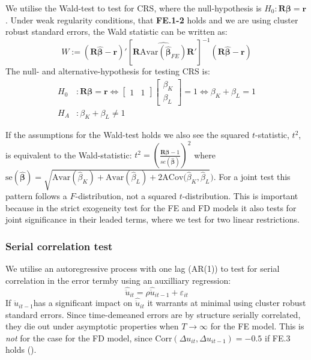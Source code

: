 
We utilise the Wald-test to test for CRS, where the null-hypothesis is $H_0: \mathbf{R}\boldsymbol{\beta}=\mathbf{r}$. Under weak regularity conditions, that \textbf{FE.1-2} holds and we are using cluster robust standard errors, the Wald statistic can be written as:
\begin{equation*}
    W:=(\mathbf{R}{\boldsymbol{\hat\beta}}-\mathbf{r})'
    [\mathbf{R}\widehat{\text{Avar}({\boldsymbol{\hat{\beta}}}_{FE})}\mathbf{R}']^{-1}
    (\mathbf{R} \boldsymbol{\hat{\beta}}-\mathbf{r})
\end{equation*}
The null- and alternative-hypothesis for testing CRS is:
\begin{align*}
  H_0 & : \mathbf{R}\boldsymbol{\beta}=\mathbf{r} \Leftrightarrow
\begin{bmatrix} 1&1 \end{bmatrix} \begin{bmatrix} \beta_K \\ \beta_L \end{bmatrix} =1
\Leftrightarrow \beta_K+\beta_L=1  \\
H_A & : \beta_K+\beta_L \neq 1
\end{align*}

If the assumptions for the Wald-test holds we also see the squared $t$-statistic, $t^2$, is equivalent to the Wald-statistic: $t^2=(\frac{\textbf{R}\bm{\hat\beta}-1}{se(\bm{\hat\beta})})^2$ where  $\text{se}(\bm{\hat\beta})=\sqrt{\text{Avar}(\hat\beta_K)+\text{Avar}(\hat\beta_L)+2\text{ACov}({\hat\beta_K,\hat\beta_L}})$. For a joint test this pattern follows a $F$-distribution, not a squared $t$-distribution. This is important because in the strict exogeneity test for the FE and FD models it also tests for joint significance in their leaded terms, where we test for two linear restrictions.

\subsubsection*{Serial correlation test}
We utilise an autoregressive process with one lag (AR(1)) to test for serial correlation in the error termby using an auxilliary regression:
\begin{equation*}
    \hat{\ddot{u}}_{it}=\rho \hat{\ddot{u}}_{it-1}+\varepsilon_{it}
\end{equation*}
If $\hat{\ddot{u}}_{it-1}$has a significant impact on $\hat{\ddot{u}}_{it}$ it warrants at minimal using cluster robust standard errors. Since time-demeaned errors are by structure serially correlated, they die out under asymptotic properties when $T\rightarrow \infty$ for the FE model. This is \textit{not} for the case for the FD model, since $\text{Corr}(\Delta u_{it},\Delta u_{it-1})=-0.5$ if FE.3 holds (\cite[Chapter~10.6.3]{wooldridgeEconometricAnalysisCross2010}). 

